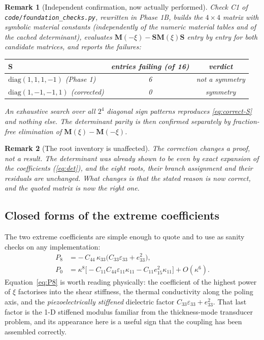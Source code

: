 \documentclass[11pt]{article}
\newcommand{\eps}{\varepsilon}
\theoremstyle{plain}
\newtheorem{remark}{Remark}
\begin{document}
\begin{remark}[Independent confirmation, now actually performed]
\label{rem:parity-check}
Check C1 of \texttt{code/foundation\_checks.py}, rewritten in Phase 1B, builds the
$4\times4$ matrix with \emph{symbolic} material constants (independently of the
numeric material tables and of the cached determinant), evaluates
$\bm{M}(-\xi)-\bm{S}\bm{M}(\xi)\bm{S}$ entry by entry for \emph{both} candidate
matrices, and reports the failures:
\begin{center}
\begin{tabular}{@{}lcc@{}}
\toprule
$\bm{S}$ & entries failing (of 16) & verdict \\
\midrule
$\mathrm{diag}(1,1,1,-1)$ (Phase 1) & 6 & not a symmetry \\
$\mathrm{diag}(1,-1,-1,1)$ (corrected) & 0 & symmetry \\
\bottomrule
\end{tabular}
\end{center}
An exhaustive search over all $2^4$ diagonal sign patterns reproduces
\eqref{eq:correct-S} and nothing else. The determinant parity is then confirmed
separately by fraction-free elimination of $\bm{M}(\xi)-\bm{M}(-\xi)$.
\end{remark}

\begin{remark}[The root inventory is unaffected]
\label{rem:roots-unaffected}
The correction changes a \emph{proof}, not a \emph{result}. The determinant was
already shown to be even by exact expansion of the coefficients
(\eqref{eq:det}), and the eight roots, their branch assignment and their
residuals are unchanged. What changes is that the stated reason is now correct,
and the quoted matrix is now the right one.
\end{remark}

\subsection{Closed forms of the extreme coefficients}

The two extreme coefficients are simple enough to quote and to use as sanity
checks on any implementation:
\begin{align}
  P_8 &= -\,C_{44}\,\kappa_{33}\big(C_{33}\eps_{33} + e_{33}^2\big),
  \label{eq:P8}\\
  P_0 &= \kappa^8\Big[-C_{11}C_{44}\eps_{11}\kappa_{11}
        - C_{11}e_{15}^2\kappa_{11}\Big] + O(\kappa^6).
  \label{eq:P0}
\end{align}
Equation~\eqref{eq:P8} is worth reading physically: the coefficient of the highest
power of $\xi$ factorises into the shear stiffness, the thermal conductivity along
the poling axis, and the \emph{piezoelectrically stiffened} dielectric factor
$C_{33}\eps_{33}+e_{33}^2$. That last factor is the 1-D stiffened modulus familiar
from the thickness-mode transducer problem, and its appearance here is a useful
sign that the coupling has been assembled correctly.
\end{document}
